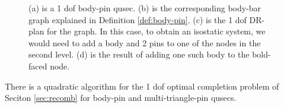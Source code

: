 \begin{figure}
    
\caption{(a) is a 1 dof body-pin qusec. (b) is the corresponding body-bar graph explained in Definition \ref{def:body-pin}. (c) is the 1 dof DR-plan for the graph. In this case, to obtain an isostatic system, we would need to add a body and 2 pins to one of the nodes in the second level. (d) is the result of adding one such body to the bold-faced node.}

\end{figure}

\begin{theorem}
    There is a quadratic algorithm for the 1 dof optimal completion problem of Seciton \ref{sec:recomb} for body-pin and multi-triangle-pin qusecs.
\end{theorem}

